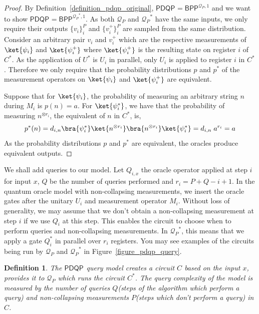 \documentclass[10pt,a4paper]{article}
\newcommand{\queryamount}[0]{\ensuremath{Q}\xspace}
\newcommand{\abilityamount}[0]{\ensuremath{P}\xspace} %
\newcommand{\pdqporacle}[0]{\ensuremath{\mathcal{Q}_P}\xspace}
\newcommand{\parallelregisters}[0]{\ensuremath{r_i}\xspace}
\newcommand{\compclass}[2][]{\ensuremath{\mathsf{#2}^{#1}}\xspace}
\newcommand{\pdqpname}[0]{\compclass{PDQP}}
\newtheorem{definition}[theorem]{Definition}
\begin{document}
\begin{proof}
    By Definition~\ref{definition_pdqp_original}, $\pdqpname=\compclass[\pdqporacle,1]{BPP}$ and we want to show $\pdqpname=\compclass[\pdqporacle^*,1]{BPP}$. As both $\pdqporacle$ and $\pdqporacle^*$ have the same inputs, we only require their outputs $\{v_i\}_i^\abilityamount$ and $\{v_i^+\}_i^\abilityamount$ are sampled from the same distribution. Consider an arbitrary pair $v_i$ and $v_i^+$ which are the respective measurements of $\ket{\psi_i}$ and $\ket{\psi_i^+}$ where $\ket{\psi_i^+}$ is the resulting state on register $i$ of $C^*$. As the application of $U^*$ is $U_i$ in parallel, only $U_i$ is applied to register $i$ in $C^*$. Therefore we only require that the probability distributions $p$ and $p^*$ of the measurement operators on $\ket{\psi_i}$ and $\ket{\psi_i^+}$ are equivalent.

    Suppose that for $\ket{\psi_i}$, the probability of measuring an arbitrary string $n$ during $M_i$ is $p(n)=a$. For $\ket{\psi_{i}^*}$, we have that the probability of measuring $n^{\otimes \parallelregisters}$, the equivalent of $n$ in $C^*$, is,
    \begin{align*}
        p^*(n) =  d_{i,n} \bra{\psi_{i}^*}\ket{n^{\otimes \parallelregisters}}\bra{n^{\otimes \parallelregisters}}\ket{\psi_{i}^*} = d_{i,n}\;a^{\parallelregisters} = a
    \end{align*}
    As the probability distributions $p$ and $p^*$ are equivalent, the oracles produce equivalent outputs.
\end{proof}

We shall add queries to our model. Let $Q_{i,x}$ the oracle operator applied at step $i$ for input $x$, \queryamount be the number of queries performed and $\parallelregisters = P + Q - i + 1$. In the quantum oracle model with non-collapsing measurements, we insert the oracle gates after the unitary $U_i$ and measurement operator $M_i$. Without loss of generality, we may assume that we don't obtain a non-collapsing measurement at step $i$ if we use $Q_i$ at this step. This enables the circuit to choose when to perform queries and non-collapsing measurements. In $\pdqporacle^*$, this means that we apply a gate $Q_i^*$ in parallel over \parallelregisters registers. You may see examples of the circuits being run by \pdqporacle and $\pdqporacle^*$ in Figure~\ref{figure_pdqp_query}. 

\begin{definition}\label{definition_pdqp_our}
    The \pdqpname query model creates a circuit $C$ based on the input $x$, provides it to \pdqporacle which runs the circuit $C^*$. The query complexity of the model is measured by the number of queries \queryamount (steps of the algorithm which perform a query) and non-collapsing measurements \abilityamount (steps which don't perform a query) in $C$.
\end{definition}
\end{document}
